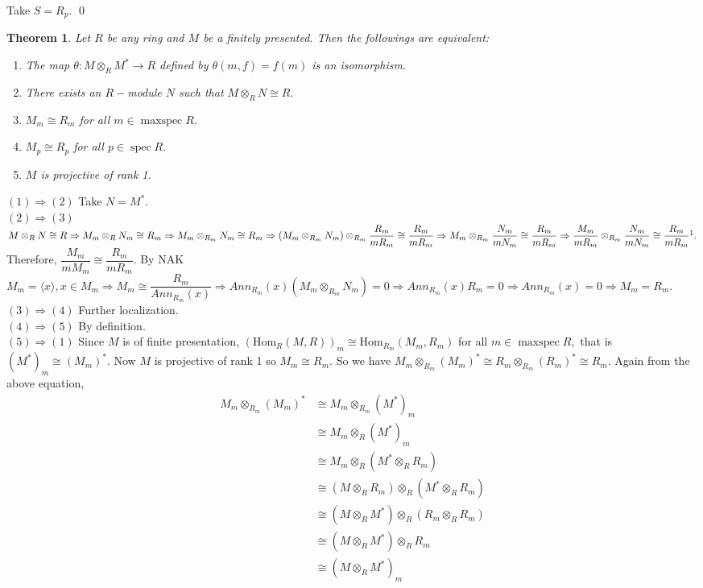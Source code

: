 \documentclass[11pt]{amsart}
\newtheorem{theorem}{Theorem}[section]
\newcommand{\gen}[1]{\langle#1\rangle}
\newcommand{\Hom}[1]{\text{Hom}_R\left(#1\right)}
\DeclareMathOperator{\spec}{\text{spec}}
\DeclareMathOperator{\mspec}{\text{maxspec}}
\begin{document}
\proof Take $S=R_p.$ \qed


\begin{theorem}

Let $R$ be any ring and $M$ be a finitely presented. Then the followings are equivalent:
\begin{enumerate}

\item The map $\theta:M\otimes_R M^*\to R$ defined by $\theta(m,f)=f(m)$ is an isomorphism.

\item There exists an $R-$module $N$ such that $M\otimes_R N\cong R.$

\item $M_m\cong R_m$ for all $m\in\mspec R.$

\item $M_p\cong R_p$ for all $p\in \spec R.$

\item $M$ is projective of rank 1.

\end{enumerate}

\end{theorem}

\proof $(1)\Rightarrow (2)$ Take $N=M^*.$\\
$(2)\Rightarrow (3)$ $M\otimes_R N \cong R\Rightarrow M_m\otimes_R N_m \cong R_m \Rightarrow M_m\otimes_{R_m} N_m\cong R_m \Rightarrow (M_m\otimes_{R_m} N_m)\otimes_{R_m} \dfrac{R_m}{mR_m}\cong \dfrac{R_m}{mR_m}\Rightarrow M_m\otimes_{R_m} \dfrac{N_m}{mN_m}\cong \dfrac{R_m}{mR_m}\Rightarrow \dfrac{M_m}{mR_m}\otimes_{R_m} \dfrac{N_m}{mN_m}\cong \dfrac{R_m}{mR_m}\footnote{As $K(m):=\dfrac{R_m}{mR_m}$ and $K(m)^l\otimes K(m)^s\cong K(m)^{ls}.$}.$ Therefore, $\dfrac{M_m}{mM_m}\cong \dfrac{R_m}{mR_m}.$ By NAK $M_m=\gen{x},x\in M_m \Rightarrow M_m\cong \dfrac{R_m}{Ann_{R_m}(x)} \Rightarrow Ann_{R_m}(x)(M_m\otimes_{R_m} N_m)=0 \Rightarrow Ann_{R_m}(x) R_m=0 \Rightarrow Ann_{R_m}(x)=0 \Rightarrow M_m=R_m.$\\

$(3)\Rightarrow (4)$ Further localization.\\

$(4)\Rightarrow (5)$ By definition.\\

$(5)\Rightarrow (1)$ Since $M$ is of finite presentation, $(\Hom{M,R})_m\cong \text{Hom}_{R_m}(M_m,R_m)$ for all $m\in\mspec R,$ that is $(M^*)_m\cong (M_m)^*.$ Now $M$ is projective of rank 1 so $M_m\cong R_m.$ So we have $M_m\otimes_{R_m} (M_m)^*\cong R_m\otimes_{R_m} (R_m)^*\cong R_m.$ Again from the above equation, \begin{align*}
M_m\otimes_{R_m} (M_m)^* &\cong M_m\otimes_{R_m} (M^*)_m\\
&\cong M_m \otimes_R (M^*)_m\\
&\cong M_m\otimes_R (M^*\otimes_R R_m)\\
&\cong (M\otimes_R R_m)\otimes_R (M^*\otimes_R R_m)\\
&\cong (M\otimes_R M^*)\otimes_R (R_m\otimes_R R_m)\\
&\cong (M\otimes_R M^*)\otimes_R R_m\\
&\cong (M\otimes_R M^*)_m
\end{align*}
  
\end{document}
